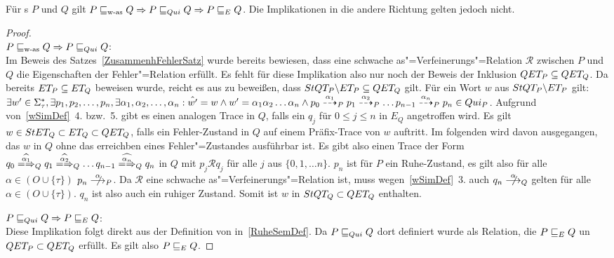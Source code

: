 \begin{Satz}
  Für \MEIO{}s $P$ und $Q$ gilt $P \sqsubseteq _{\mathrm{w}\text{-}\mathrm{as}} Q \Rightarrow P  \sqsubseteq  _{Qui} Q \Rightarrow
  P  \sqsubseteq  _E Q$. Die Implikationen in die andere Richtung gelten jedoch nicht.
\end{Satz}
\begin{proof}\mbox{}\\
  $P \sqsubseteq _{\mathrm{w}\text{-}\mathrm{as}} Q \Rightarrow P  \sqsubseteq  _{Qui} Q$:\\
  Im Beweis des Satzes~\ref{ZusammenhFehlerSatz} wurde bereits bewiesen, dass
  eine schwache as"=Verfeinerungs"=Relation $\mathcal{R}$ zwischen $P$ und $Q$
  die Eigenschaften der Fehler"=Relation \ERel{} erfüllt. Es fehlt für diese
  Implikation also nur noch der Beweis der Inklusion $QET _P \subseteq QET
  _Q$. Da bereits $ET _P\subseteq ET _Q$ beweisen wurde, reicht es aus zu
  beweißen, dass $StQT _P \backslash ET _P\subseteq QET _Q$ gilt. Für ein
  Wort $w$ aus $StQT _P \backslash ET _P$ gilt: $\exists w'\in\Sigma _{\tau}
  ^*, \exists p_1, p_2, \dots , p_n, \exists \alpha _1, \alpha _2, \dots
  ,\alpha _n: \hat{w'} = w \land w' = \alpha _1\alpha _2\dots\alpha _n \land
  p_0 \may[\alpha _1]_P p_1 \may[\alpha _2]_P \dots p_{n-1} \may[\alpha _n]_P
  p_n \in Qui _P$. Aufgrund von~\ref{wSimDef}~4. bzw.~5. gibt es einen analogen
  Trace in $Q$, falls ein $q_j$ für $0\leq j \leq n$ in $E_Q$ angetroffen wird.
  Es gilt $w\in StET _Q\subset ET _Q\subset QET _Q$, falls ein Fehler-Zustand
  in $Q$ auf einem Präfix-Trace von $w$ auftritt. Im folgenden wird davon
  ausgegangen, das $w$ in $Q$ ohne das erreichben eines Fehler"=Zustandes
  ausführbar ist. Es gibt also einen Trace der Form $q_0
  \weakmay[\widehat{\alpha _1}]_Q q_1 \weakmay[\widehat{\alpha _2}]_Q \dots
  q_{n-1} \weakmay[\widehat{\alpha _n}]_Q q_n$ in $Q$ mit $p_j \mathcal{R} q_j$
  für alle $j$ aus $\{0,1,\dots n\}$. $p_n$ ist für $P$ ein Ruhe-Zustand, es
  gilt also für alle $\alpha \in (O\cup \{\tau\})$ $p_n \nmust[\alpha]_P$. Da
  $\mathcal{R}$ eine schwache as"=Verfeinerungs"=Relation ist, muss
  wegen~\ref{wSimDef}~3. auch $q_n \nmust[\alpha]_Q$ gelten für alle $\alpha
  \in (O\cup \{\tau\})$. $q_n$ ist also auch ein ruhiger Zustand. Somit ist $w$
  in $StQT _Q\subset QET _Q$ enthalten.

  $P  \sqsubseteq  _{Qui} Q \Rightarrow P  \sqsubseteq  _E Q$:\\
  Diese Implikation folgt direkt aus der Definition von \QRel{}
  in~\ref{RuheSemDef}. Da $P  \sqsubseteq  _{Qui} Q$ dort definiert wurde als Relation, die
  $P  \sqsubseteq  _E Q$ un $QET _P \subset QET _Q$ erfüllt. Es gilt also $P  \sqsubseteq  _E Q$.


\end{proof}
